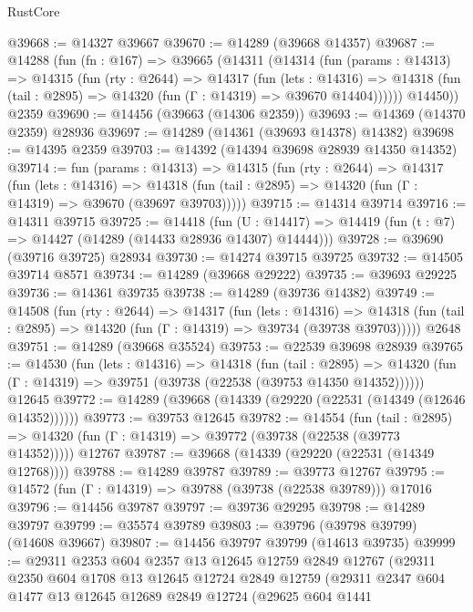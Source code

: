 \begin{lexlean}{RustCore}
\begin{coremodule}
@39668 := @14327 @39667
@39670 := @14289 (@39668 @14357)
@39687 := @14288
    (fun (fn : @167) =>
    @39665
      (@14311
        (@14314
          (fun (params : @14313) =>
          @14315
            (fun (rty : @2644) =>
            @14317
              (fun (lets : @14316) =>
              @14318 (fun (tail : @2895) => @14320 (fun (Γ : @14319) => @39670 @14404))))))
        @14450))
    @2359
@39690 := @14456 (@39663 (@14306 @2359))
@39693 := @14369 (@14370 @2359) @28936
@39697 := @14289 (@14361 (@39693 @14378) @14382)
@39698 := @14395 @2359
@39703 := @14392 (@14394 @39698 @28939 @14350 @14352)
@39714 := fun (params : @14313) =>
  @14315
    (fun (rty : @2644) =>
    @14317
      (fun (lets : @14316) =>
      @14318 (fun (tail : @2895) => @14320 (fun (Γ : @14319) => @39670 (@39697 @39703)))))
@39715 := @14314 @39714
@39716 := @14311 @39715
@39725 := @14418
    (fun (U : @14417) => @14419 (fun (t : @7) => @14427 (@14289 (@14433 @28936 @14307) @14444)))
@39728 := @39690 (@39716 @39725) @28934
@39730 := @14274 @39715 @39725
@39732 := @14505 @39714 @8571
@39734 := @14289 (@39668 @29222)
@39735 := @39693 @29225
@39736 := @14361 @39735
@39738 := @14289 (@39736 @14382)
@39749 := @14508
    (fun (rty : @2644) =>
    @14317
      (fun (lets : @14316) =>
      @14318 (fun (tail : @2895) => @14320 (fun (Γ : @14319) => @39734 (@39738 @39703)))))
    @2648
@39751 := @14289 (@39668 @35524)
@39753 := @22539 @39698 @28939
@39765 := @14530
    (fun (lets : @14316) =>
    @14318
      (fun (tail : @2895) =>
      @14320 (fun (Γ : @14319) => @39751 (@39738 (@22538 (@39753 @14350 @14352))))))
    @12645
@39772 := @14289 (@39668 (@14339 (@29220 (@22531 (@14349 (@12646 @14352))))))
@39773 := @39753 @12645
@39782 := @14554
    (fun (tail : @2895) => @14320 (fun (Γ : @14319) => @39772 (@39738 (@22538 (@39773 @14352)))))
    @12767
@39787 := @39668 (@14339 (@29220 (@22531 (@14349 @12768))))
@39788 := @14289 @39787
@39789 := @39773 @12767
@39795 := @14572 (fun (Γ : @14319) => @39788 (@39738 (@22538 @39789))) @17016
@39796 := @14456 @39787
@39797 := @39736 @29295
@39798 := @14289 @39797
@39799 := @35574 @39789
@39803 := @39796 (@39798 @39799) (@14608 @39667)
@39807 := @14456 @39797 @39799 (@14613 @39735)
@39999 := @29311
    @2353
    @604
    @2357
    @13
    @12645
    @12759
    @2849
    @12767
    (@29311
      @2350
      @604
      @1708
      @13
      @12645
      @12724
      @2849
      @12759
      (@29311
        @2347
        @604
        @1477
        @13
        @12645
        @12689
        @2849
        @12724
        (@29625
          @604
          @1441

\end{coremodule}
\end{lexlean}
